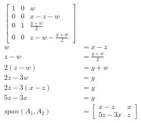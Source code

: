 \documentclass{math}
\begin{document}
\begin{align*}
\begin{bmatrix}
    1 & 0 & w \\
    0 & 0 & x-z-w \\
    0 & 1 & \frac{y+w}{2} \\
    0 & 0 & z-w-\frac{y+w}{2}
  \end{bmatrix} \\
  w &= x-z \\
  z-w &= \frac{y+w}{2} \\
  2(z-w) &= y+w \\
  2z-3w &= y \\
  2z-3(x-z) &= y \\
  5z-3x &= y \\
  span(A_1,A_2) &= \begin{bmatrix}
    x-z & x \\
    5z-3x & z
  \end{bmatrix}
\end{align*}
\end{document}
